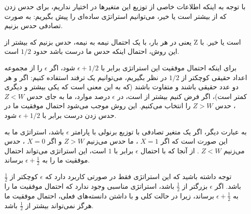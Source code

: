 با توجه به اینکه اطلاعات خاصی از توزیع این متغیرها در اختیار نداریم، برای حدس زدن که
از
بیشتر است یا خیر، می‌توانیم استراتژی ساده‌ای را پیش بگیریم: به صورت تصادفی حدس بزنیم.

یعنی در هر بار، با یک احتمال نیمه به نیمه، حدس بزنیم که
بیشتر از Z است یا خیر. با این روش، احتمال اینکه حدس ما درست باشد حدود
$1/2$
است.

برای اینکه احتمال موفقیت این استراتژی برابر با
$\epsilon + 1/2$
شود، اگر
$\epsilon$
را از مجموعه اعداد حقیقی کوچکتر از
$1/2 $
در نظر بگیریم، می‌توانیم یک ترفند استفاده کنیم: اگر
و
هر دو عدد حقیقی باشند و متفاوت باشند (که به این معنی است که یکی بیشتر و دیگری کمتر است)، اگر فرض کنیم
بیشتر از
است، در
$\epsilon$ 
درصد موارد، ما به جای حدس
$Z<W$
، حدس
$Z>W$
را انتخاب می‌کنیم. این روش موجب می‌شود احتمال موفقیت ما در حدس زدن درست برابر با 
$\epsilon + 1/2$
شود.

به عبارت دیگر، اگر
یک متغیر تصادفی با توزیع برنولی با پارامتر
$\epsilon$ 
باشد، استراتژی ما به این صورت است که اگر
$X=1$
، ما حدس می‌زنیم
$Z>W$
و اگر
$X=0$
، حدس می‌زنیم
$Z<W$
. از آنجا که
با احتمال
$\epsilon$ 
برابر با
$1 $
 است، این استراتژی می‌تواند احتمال موفقیت ما را به
$\epsilon + \frac{1}{2}$
 برساند.

توجه داشته باشید که این استراتژی فقط در صورتی کاربرد دارد که
$\epsilon$
کوچکتر از
$\frac{1}{2}$
باشد. اگر
$\epsilon$
بزرگتر از
$\frac{1}{2}$ 
باشد، استراتژی مناسبی وجود ندارد که احتمال موفقیت ما را به
$\epsilon + \frac{1}{2}$
برساند، زیرا در حالت کلی و با داشتن دانسته‌های فعلی، احتمال موفقیت ما هرگز نمی‌تواند بیشتر از
$\frac{1}{2}$
باشد.
 
 
 